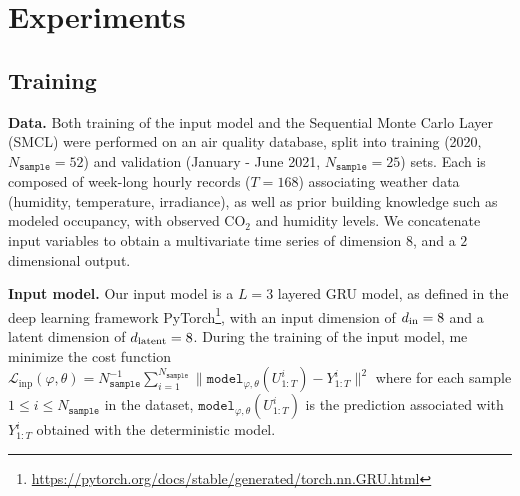 \documentclass{article}
\begin{document}

\section{Experiments}
\label{sec:exp}

\subsection{Training}%
\label{sub:training}
{\bf Data.} Both training of the input model and the Sequential Monte Carlo Layer (SMCL) were performed on an air quality database, split into training (2020, $N_{\texttt{sample}}=52$) and validation (January - June 2021, $N_{\texttt{sample}}=25$) sets.
Each is composed of week-long hourly records ($T=168$) associating weather data (humidity, temperature, irradiance), as well as prior building knowledge such as modeled occupancy, with observed \ensuremath{\mathrm{CO_2}} and humidity levels.
We concatenate input variables to obtain a multivariate time series of dimension $8$, and a $2$ dimensional output.

	{\bf Input model.} Our input model is a $L=3$ layered GRU model, as defined in the deep learning framework PyTorch\footnote{\href{https://pytorch.org/docs/stable/generated/torch.nn.GRU.html}{https://pytorch.org/docs/stable/generated/torch.nn.GRU.html}}, with an input dimension of $d_\textnormal{in}=8$ and a latent dimension of $d_\textnormal{latent}=8$.
During the training of the input model, me minimize the cost function $\mathcal{L}_{\mathrm{inp}}(\varphi,\theta) = N_{\texttt{sample}}^{-1} \sum_{i=1}^{N_{\texttt{sample}}} \|\texttt{model}_{\varphi,\theta}(U^i_{1:T}) - Y^i_{1:T}\|^2$ where for each sample $1 \leq i \leq N_{\texttt{sample}}$ in the dataset, $\texttt{model}_{\varphi,\theta}(U^i_{1:T})$ is the prediction associated with $Y^i_{1:T}$ obtained with the deterministic model.
\end{document}
